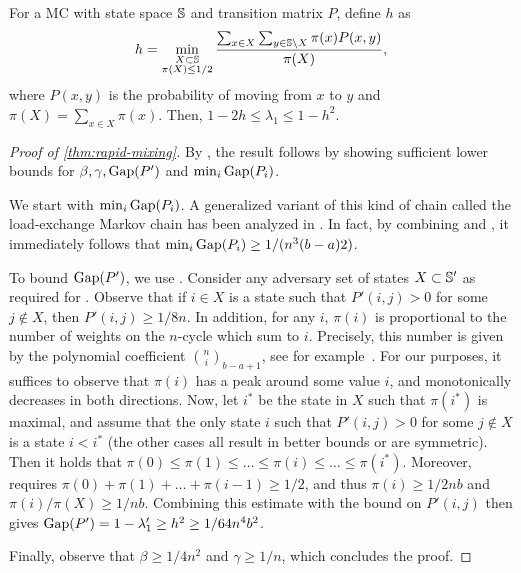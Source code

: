 \begin{lemma}
    \label{lem:conductance}
    For a MC with state space $\mathbb S$ and transition matrix $P$, define $h$ as $$
    h = \min_{\substack{X \subset \mathbb S \\ \pi(X) \leq {1}/{2}}}\frac{\sum_{x \in X}\sum_{y \in \mathbb S \setminus X} \pi(x) P(x,y)}{\pi(X)},
    $$ where $P(x, y)$ is the probability of moving from $x$ to $y$ and $\pi(X) = \sum_{x \in X}\pi(x)$.
    Then, $1 - 2h \leq \lambda_1 \leq 1 - h^2$.
\end{lemma}

\begin{proof}[Proof of \cref{thm:rapid-mixing}]
    By , the result follows by showing sufficient lower bounds for $\beta, \gamma, \operatorname{Gap}(P')$ and $\min_i \operatorname{Gap}(P_i)$.
	
    We start with $\min_i \operatorname{Gap}(P_i)$.
    A generalized variant of this kind of chain called the load-exchange Markov chain has been analyzed in \cite{DBLP:conf/stacs/AmanatidisK23}.
    In fact, by combining \cite[Theorem 4.2]{DBLP:conf/stacs/AmanatidisK23} and \cite[Cor.~2.5]{DBLP:conf/stacs/AmanatidisK23}, it immediately follows that $\min_i \operatorname{Gap}(P_i) \geq 1 / (n^3 (b - a) 2)$.
    
    To bound $\operatorname{Gap}(P')$, we use .
    Consider any adversary set of states $X \subset \mathbb S'$ as required for .
    Observe that if $i \in X$ is a state such that $P'(i,j) > 0$ for some $j \notin X$, then $P'(i,j) \geq 1 / 8 n$.
    In addition, for any $i$, $\pi(i)$ is proportional to the number of weights on the $n$-cycle which sum to $i$.
    Precisely, this number is given by the polynomial coefficient   $\binom{n}{i}_{b - a + 1}$, see for example~\cite{AdvComb, UniformDist}.
    For our purposes, it suffices to observe that $\pi(i)$ has a peak around some value $i$, and monotonically decreases in both directions.
    Now, let $i^*$ be the state in $X$ such that $\pi(i^*)$ is maximal, and assume that the only state $i$ such that $P'(i,j) > 0$ for some $j \notin X$ is a state $i < i^*$ (the other cases all result in better bounds or are symmetric).
    Then it holds that
    $\pi(0) \leq \pi(1) \leq \dots \leq \pi(i) \leq \dots \leq \pi(i^*)$.
    Moreover,  requires $\pi(0) + \pi(1) + \dots + \pi(i - 1) \geq 1 / 2$, and thus $\pi(i) \geq 1 / 2 nb$ and $\pi(i) / \pi(X) \geq 1 / nb$.
    Combining this estimate with the bound on $P'(i, j)$ then gives $\operatorname{Gap}(P') = 1 - \lambda_1' \geq h^2 \geq 1 / 64 n^4 b^2$.
	
    Finally, observe that $\beta \geq 1 / 4 n^2$ and $\gamma \geq 1 / n$, which concludes the proof.
\end{proof}

